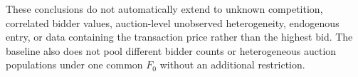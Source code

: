 These conclusions do not automatically extend to unknown competition,
correlated bidder values, auction-level unobserved heterogeneity, endogenous
entry, or data containing the transaction price rather than the highest bid.
The baseline also does not pool different bidder counts or heterogeneous
auction populations under one common $F_0$ without an additional restriction.

